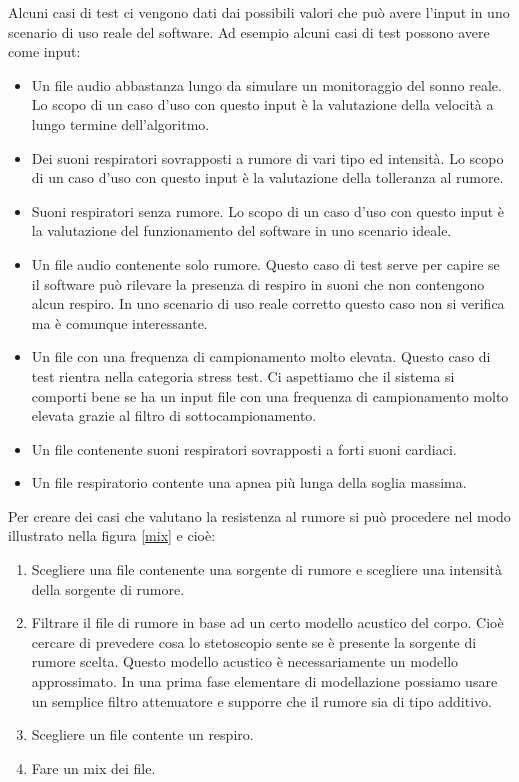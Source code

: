 Alcuni casi di test ci vengono dati dai possibili valori che pu\`o avere l'input in uno scenario di uso reale del software. Ad esempio alcuni casi di test possono avere come input:
\begin{itemize}
  \item
    Un file audio abbastanza lungo da simulare un monitoraggio del sonno reale. Lo scopo di un caso d'uso con questo input \`e la valutazione della velocit\`a a lungo termine dell'algoritmo.
  \item
    Dei suoni respiratori sovrapposti a rumore di vari tipo ed intensit\`a. Lo scopo di un caso d'uso con questo input \`e la valutazione della tolleranza al rumore.
  \item
    Suoni respiratori senza rumore. Lo scopo di un caso d'uso con questo input \`e la valutazione del funzionamento del software in uno scenario ideale.
  \item
    Un file audio contenente solo rumore. Questo caso di test serve per capire se il software pu\`o rilevare la presenza di respiro in suoni che non contengono alcun respiro. In uno scenario di uso reale corretto questo caso non si verifica ma \`e comunque interessante.
  \item
    Un file con una frequenza di campionamento molto elevata. Questo caso di test rientra nella categoria stress test. Ci aspettiamo che il sistema si comporti bene se ha un input file con una frequenza di campionamento molto elevata grazie al filtro di sottocampionamento.
  \item
    Un file contenente suoni respiratori sovrapposti a forti suoni cardiaci. 
  \item
    Un file respiratorio contente una apnea pi\`u lunga della soglia massima.
\end{itemize}

Per creare dei casi che valutano la resistenza al rumore si pu\`o procedere nel modo illustrato nella figura \ref{mix} e cio\`e:
\begin{enumerate}
  \item 
    Scegliere una file contenente una sorgente di rumore e scegliere una intensit\`a della sorgente di rumore.
  \item
    Filtrare il file di rumore in base ad un certo modello acustico del corpo. Cio\`e cercare di prevedere cosa lo stetoscopio sente se \`e presente la sorgente di rumore scelta. Questo modello acustico \`e necessariamente un modello approssimato. In una prima fase elementare di modellazione possiamo usare un semplice filtro attenuatore e supporre che il rumore sia di tipo additivo.
  \item
    Scegliere un file contente un respiro.
  \item
    Fare un mix dei file.
\end{enumerate}


